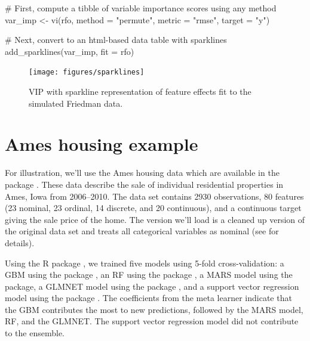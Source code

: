 \begin{example}
# First, compute a tibble of variable importance scores using any method
var_imp <- vi(rfo, method = "permute", metric = "rmse", target = "y")

# Next, convert to an html-based data table with sparklines
add_sparklines(var_imp, fit = rfo)
\end{example}

\begin{figure}[!htb]
  \centering 
  \texttt{[image: figures/sparklines]} 
  \caption{VIP with sparkline representation of feature effects fit to the simulated Friedman data.}
  \label{fig:sparklines}
\end{figure}


\section{Ames housing example}

For illustration, we'll use the Ames housing data which are available in the  package \citep{AmesHousing-pkg}. These data describe the sale of individual residential properties in Ames, Iowa from 2006--2010. The data set contains 2930 observations, 80 features (23 nominal, 23 ordinal, 14 discrete, and 20 continuous), and a continuous target giving the sale price of the home. The version we'll load is a cleaned up version of the original data set and treats all categorical variables as nominal (see  for details).

Using the R package  \citep{SuperLearner-pkg}, we trained five models using 5-fold cross-validation: a GBM using the  package \citep{xgboost-pkg}, an RF using the  package \citep{ranger-pkg}, a MARS model using the  package, a GLMNET model using the  package \citep{glmnet-pkg}, and a support vector regression model using the  package \citep{kernlab-pkg}. The coefficients from the meta learner indicate that the GBM contributes the most to new predictions, followed by the MARS model, RF, and the GLMNET. The support vector regression model did not contribute to the ensemble.


